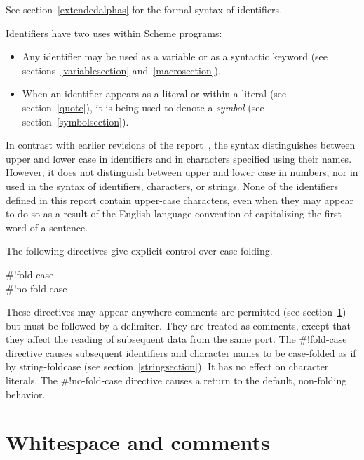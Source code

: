 See section~\ref{extendedalphas} for the formal syntax of identifiers.

\vest Identifiers have two uses within Scheme programs:
\begin{itemize}
\item Any identifier may be used as a variable
 or as a syntactic keyword
(see sections~\ref{variablesection} and~\ref{macrosection}).

\item When an identifier appears as a literal or within a literal
(see section~\ref{quote}), it is being used to denote a {\em symbol}
(see section~\ref{symbolsection}).
\end{itemize}

In contrast with earlier revisions of the report~\cite{R5RS}, the
syntax distinguishes between upper and lower case in
identifiers and in characters specified using their names.  However, it
does not distinguish between upper and lower case in numbers,
nor in  used
in the syntax of identifiers, characters, or strings.
None of the identifiers defined in this report contain upper-case
characters, even when they may appear to do so as a result
of the English-language convention of capitalizing the first word of
a sentence.

The following directives give explicit control over case
folding.

\begin{entry}{%
{\cf{}\#!fold-case}\\
{\cf{}\#!no-fold-case}}

These directives may appear anywhere comments are permitted (see
section~\ref{wscommentsection}) but must be followed by a delimiter.
They are treated as comments, except that they affect the reading
of subsequent data from the same port. The {\cf{}\#!fold-case} directive causes
subsequent identifiers and character names to be case-folded
as if by {\cf string-foldcase} (see section~\ref{stringsection}).
It has no effect on character
literals.  The {\cf{}\#!no-fold-case} directive
causes a return to the default, non-folding behavior.
\end{entry}



\section{Whitespace and comments}
\label{wscommentsection}

